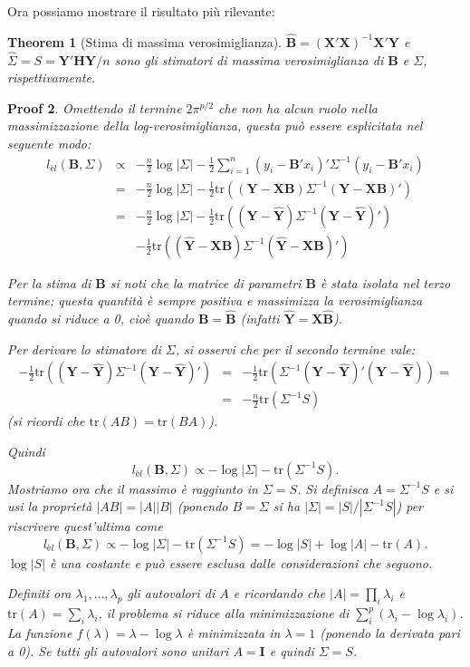 \documentclass[10pt]{article}
\newtheorem{thm}{Theorem}[section]
\newtheorem{prf}[thm]{Proof}
\newcommand{\bfB}{\mathbf{B}}
\newcommand{\HH}{\mathbf{H}}
\newcommand{\tr}{\mathrm{tr}}
\newcommand{\XX}{\mathbf{X}}
\newcommand{\YY}{\mathbf{Y}}
\newcommand{\I}{\mathbf{I}}
\begin{document}
Ora possiamo mostrare il risultato più rilevante:
\begin{thm}[Stima di massima verosimiglianza]
$\hat{\bfB}=(\XX'\XX)^{-1}\XX'\YY$ e $\hat{\Sigma}=S=\YY'\HH\YY/n$ sono gli stimatori di massima verosimiglianza di $\bfB$ e $\Sigma$, rispettivamente.
\end{thm}
\begin{prf}
Omettendo il termine $2\pi^{p/2}$ che non ha alcun ruolo nella massimizzazione della log-verosimiglianza,
questa può essere esplicitata nel seguente modo:
\begin{eqnarray}\nonumber
l_{èl}(\bfB,\Sigma) &\propto& {-\frac{n}{2}} \log|\Sigma|     -\frac{1}{2} \sum_{i=1}^n (y_i-\bfB' x_i)'\Sigma^{-1}(y_i-\bfB' x_i)\\ \nonumber
&=& {-\frac{n}{2}} \log|\Sigma|     -\frac{1}{2} \tr\left( (\YY-\XX\bfB)\Sigma^{-1}(\YY-\XX\bfB)' \right)\\  \nonumber
&=& {-\frac{n}{2}} \log|\Sigma|     -\frac{1}{2} \tr\left( (\YY-\hat{\YY})\Sigma^{-1}(\YY-\hat{\YY})' \right) \\ 
&&-\frac{1}{2} \tr\left( (\hat{\YY}-\XX\bfB)\Sigma^{-1}(\hat{\YY}-\XX\bfB)' \right) \label{logLik}
\end{eqnarray}

Per la stima di $\bfB$ si noti che la matrice di parametri $\bfB$ è stata isolata nel terzo termine; questa quantità è sempre positiva e
massimizza la verosimiglianza quando si riduce a 0, cioè quando $\bfB = \hat{\bfB}$ (infatti $\hat{\YY}=\XX\hat{\bfB}$).

Per derivare lo stimatore di $\Sigma$, si osservi che per il secondo termine vale:
\begin{eqnarray}\label{SigmaS} \nonumber
-\frac{1}{2}\tr\left((\YY-\hat{\YY})\Sigma^{-1}(\YY-\hat{\YY})'\right)&=&-\frac{1}{2}\tr\left(\Sigma^{-1}(\YY-\hat{\YY})'(\YY-\hat{\YY})\right)=\\ 
&=&-\frac{n}{2}\tr(\Sigma^{-1} S)
\end{eqnarray}
(si ricordi che $\tr(AB)=\tr(BA)$).

Quindi 
$$l_{èl}(\bfB,\Sigma)\propto -\log|\Sigma|-\tr(\Sigma^{-1} S).$$
Mostriamo ora che il massimo è raggiunto in $\Sigma=S$.
Si definisca $A=\Sigma^{-1} S$ e si usi la proprietà $|AB|=|A||B|$ (ponendo $B=\Sigma$ si ha $|\Sigma|= |S|/|\Sigma^{-1}S|$) per riscrivere quest'ultima come 
$$l_{èl}(\bfB,\Sigma)\propto -\log|\Sigma|-\tr(\Sigma^{-1} S)=-\log|S|+\log|A| -\tr(A).$$
$\log|S|$ è una costante e può essere esclusa dalle considerazioni che seguono.

Definiti ora $\lambda_1,\ldots,\lambda_p$ gli autovalori di $A$ e ricordando che $|A|=\prod_i \lambda_i$ e $\tr(A)=\sum_i \lambda_i$, il problema
si riduce alla minimizzazione di $\sum_i^p (\lambda_i-\log \lambda_i)$. La funzione $f(\lambda)=\lambda-\log \lambda$ è minimizzata in $\lambda=1$ 
(ponendo la derivata pari a 0). Se tutti gli autovalori sono unitari $A=\I$ e quindi $\Sigma=S$.
\end{prf}
\end{document}
